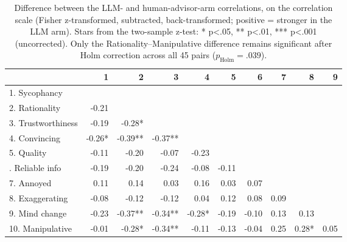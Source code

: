 \begin{table}

\caption{\label{tab:cor_diff}Difference between the LLM- and human-advisor-arm correlations, on the correlation scale (Fisher z-transformed, subtracted, back-transformed; positive = stronger in the LLM arm). Stars from the two-sample z-test: * p<.05, ** p<.01, *** p<.001 (uncorrected). Only the Rationality--Manipulative difference remains significant after Holm correction across all 45 pairs ($p_{\mathrm{Holm}} = .039$).}
\centering
\begin{tabular}[t]{lrrrrrrrrr}
\toprule
  & 1 & 2 & 3 & 4 & 5 & 6 & 7 & 8 & 9\\
\midrule
1. Sycophancy &  &  &  &  &  &  &  &  & \\
2. Rationality & -0.21 &  &  &  &  &  &  &  & \\
3. Trustworthiness & -0.19 & -0.28* &  &  &  &  &  &  & \\
4. Convincing & -0.26* & -0.39** & -0.37** &  &  &  &  &  & \\
5. Quality & -0.11 & -0.20 & -0.07 & -0.23 &  &  &  &  & \\
\addlinespace
6. Reliable info & -0.19 & -0.20 & -0.24 & -0.08 & -0.11 &  &  &  & \\
7. Annoyed & 0.11 & 0.14 & 0.03 & 0.16 & 0.03 & 0.07 &  &  & \\
8. Exaggerating & -0.08 & -0.12 & -0.12 & 0.04 & 0.12 & 0.08 & 0.09 &  & \\
9. Mind change & -0.23 & -0.37** & -0.34** & -0.28* & -0.19 & -0.10 & 0.13 & 0.13 & \\
10. Manipulative & -0.01 & -0.28* & -0.34** & -0.11 & -0.13 & -0.04 & 0.25 & 0.28* & 0.05\\
\bottomrule
\end{tabular}
\end{table}
